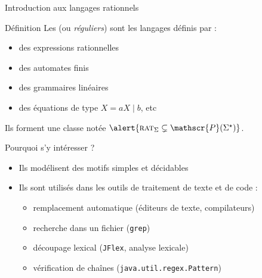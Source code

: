 
\begingroup

\begin{frame}{Introduction aux langages rationnels}
  
  \begin{block}{Définition}
    Les  (ou \emph{réguliers}) sont les langages définis par :
    \begin{itemize}
      \item des expressions rationnelles
      \item des automates finis
      \item des grammaires linéaires
      \item des équations de type $X = aX \mid b$, etc
    \end{itemize}
    Ils forment une classe notée $\alert{\textsc{rat}_\Sigma \subsetneq \mathscr{P}(\Sigma^\star)}$.
  \end{block}

  \begin{block}{Pourquoi s’y intéresser ?}
    \begin{itemize}
      \item Ils modélisent des motifs simples et décidables
      \item Ils sont utilisés dans les outils de traitement de texte et de code :
        \begin{itemize}
          \item remplacement automatique (éditeurs de texte, compilateurs)
          \item recherche dans un fichier (\texttt{grep})
          \item découpage lexical (\texttt{JFlex}, analyse lexicale)
          \item vérification de chaînes (\texttt{java.util.regex.Pattern})
        \end{itemize}
    \end{itemize}
  \end{block}

\end{frame}

\endgroup
\endinput
